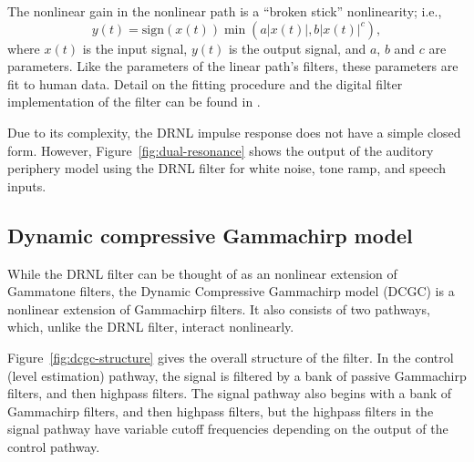 
The nonlinear gain in the nonlinear path
is a ``broken stick'' nonlinearity;
i.e.,
\begin{equation}
  y(t) = \text{sign}(x(t)) \min(a |x(t)|, b |x(t)|^c),
\end{equation}
where $x(t)$ is the input signal,
$y(t)$ is the output signal,
and $a$, $b$ and $c$ are parameters.
Like the parameters of the linear path's filters,
these parameters are fit to human data.
Detail on the fitting procedure
and the digital filter implementation
of the filter can be found in \citet{lopez2001}.

Due to its complexity,
the DRNL impulse response does not have a simple closed form.
However, Figure~\ref{fig:dual-resonance} shows the output
of the auditory periphery model
using the DRNL filter
for white noise, tone ramp, and speech inputs.


\subsection{Dynamic compressive Gammachirp model}

While the DRNL filter can be thought of
as an nonlinear extension of Gammatone filters,
the Dynamic Compressive Gammachirp model (DCGC)
\citep{irino2006}
is a nonlinear extension of Gammachirp filters.
It also consists of two pathways,
which, unlike the DRNL filter,
interact nonlinearly.


Figure~\ref{fig:dcgc-structure}
gives the overall structure of the filter.
In the control (level estimation) pathway,
the signal is filtered by
a bank of passive Gammachirp filters,
and then highpass filters.
The signal pathway
also begins with a bank of Gammachirp filters,
and then highpass filters,
but the highpass filters in the signal pathway
have variable cutoff frequencies
depending on the output of the control pathway.

